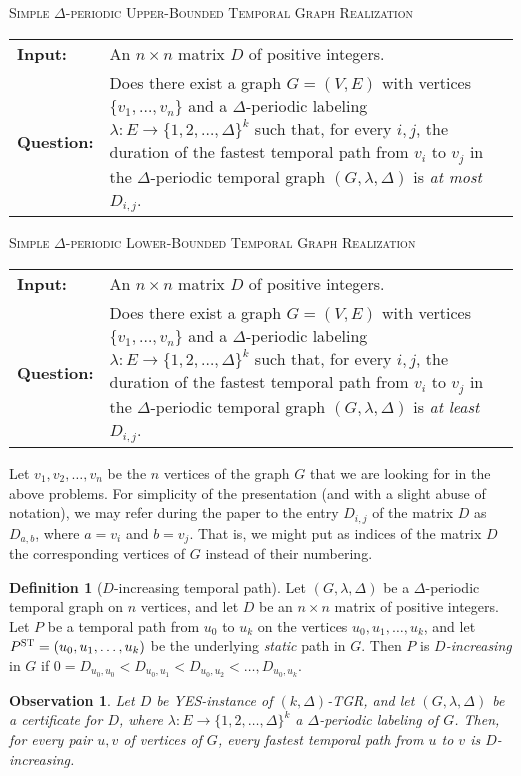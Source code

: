 \documentclass[11pt,a4paper]{article}
\makeatletter
\newtheorem{observation}{Observation}
\theoremstyle{remark}
\theoremstyle{definition}
\newtheorem{definition}[theorem]{Definition}
\newcommand{\problemdef}[3]{
	\begin{center}
		\begin{minipage}{0.95\textwidth}
			\noindent
			#1
			\vspace{5pt}\\
			\setlength{\tabcolsep}{3pt}
			\begin{tabularx}{\textwidth}{@{}lX@{}}
				\textbf{Input:}& #2 \\
				\textbf{Question:}& #3
			\end{tabularx}
		\end{minipage}
	\end{center}
}
\newcommand{\kDeltaUpperBoundLong}{\textsc{Simple $\Delta$-periodic Upper-Bounded Temporal Graph Realization}}
\newcommand{\kDeltaLowerBoundLong}{\textsc{Simple $\Delta$-periodic Lower-Bounded Temporal Graph Realization}}
\makeatother
\begin{document}
\problemdef{\kDeltaUpperBoundLong}
{An $n \times n$ matrix $D$ of positive integers.}
{Does there exist a graph $G=(V,E)$ with vertices $\{v_1,\ldots,v_{n}\}$ 
and a $\Delta$-periodic labeling $\lambda: E \rightarrow \{1,2,\ldots,\Delta\}^k$ such that, 
for every $i,j$, the duration of the fastest temporal path from $v_i$ to $v_j$ in the $\Delta$-periodic temporal graph $(G,\lambda,\Delta)$ is \emph{at most} $D_{i,j}$.}

\problemdef{\kDeltaLowerBoundLong}
{An $n \times n$ matrix $D$ of positive integers.}
{Does there exist a graph $G=(V,E)$ with vertices $\{v_1,\ldots,v_{n}\}$ 
and a $\Delta$-periodic labeling $\lambda: E \rightarrow \{1,2,\ldots,\Delta\}^k$ such that, 
for every $i,j$, the duration of the fastest temporal path from $v_i$ to $v_j$ in the $\Delta$-periodic temporal graph $(G,\lambda,\Delta)$ is \emph{at least} $D_{i,j}$.}


Let $v_1,v_2,\ldots,v_n$ be the $n$ vertices of the graph $G$ that we are looking for in the above problems. 
For simplicity of the presentation (and with a slight abuse of notation), we may refer during the paper to the entry $D_{i,j}$ of the matrix $D$ as 
$D_{a,b}$, where $a=v_i$ and $b=v_j$. That is, we might put as indices of the matrix $D$ the corresponding vertices of $G$ instead of their numbering.


\begin{definition}[$D$-increasing temporal path]
Let $(G,\lambda,\Delta)$ be a $\Delta$-periodic temporal graph on $n$ vertices, and let $D$ be an $n\times n $ matrix of positive integers. 
Let $P$ be a temporal path from $u_0$ to $u_k$ on the vertices $u_0,u_1,\ldots,u_k$, and let $P^\textsc{ST}=(u_0,u_1,\ldots,u_k)$ be the underlying \emph{static} path in $G$.
Then $P$ is \emph{$D$-increasing} in $G$ if $0=D_{u_0,u_0}<D_{u_0,u_1}<D_{u_0,u_2}<\ldots,D_{u_0,u_k}$.
\end{definition}


\begin{observation}
Let $D$ be \textsc{YES}-instance of \textsc{$(k,\Delta)$-TGR}, and let 
$(G,\lambda,\Delta)$ be a certificate for $D$, where $\lambda:E\rightarrow \{1,2,\ldots,\Delta\}^k$ a $\Delta$-periodic labeling of $G$.
Then, for every pair $u,v$ of vertices of $G$, every fastest temporal path from $u$ to $v$ is $D$-increasing.
\end{observation}






\end{document}
